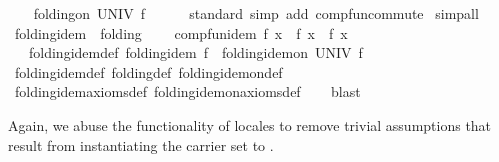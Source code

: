 \begin{isabellebody}
\ \ \isamarkupfalse%
\ {\isachardoublequoteopen}folding{\isacharunderscore}{\kern0pt}on\ UNIV\ f{\isachardoublequoteclose}\isanewline
\ \ \ \ \isamarkupfalse%
\ standard\ {\isacharparenleft}{\kern0pt}simp\ add{\isacharcolon}{\kern0pt}\ comp{\isacharunderscore}{\kern0pt}fun{\isacharunderscore}{\kern0pt}commute{\isacharparenright}{\kern0pt}\isanewline
{}\isamarkupfalse%
\ simp{\isacharunderscore}{\kern0pt}all%
\endisatagproof
{\isafoldproof}%
%
\isadelimproof
\isanewline
%
\endisadelimproof
\isanewline
{}\isamarkupfalse%
\isanewline
\isanewline
{}\isamarkupfalse%
\ folding{\isacharunderscore}{\kern0pt}idem\ {\isacharequal}{\kern0pt}\ folding\ {\isacharplus}{\kern0pt}\isanewline
\ \ \ comp{\isacharunderscore}{\kern0pt}fun{\isacharunderscore}{\kern0pt}idem{\isacharcolon}{\kern0pt}\ {\isachardoublequoteopen}f\ x\ {\isasymcirc}\ f\ x\ {\isacharequal}{\kern0pt}\ f\ x{\isachardoublequoteclose}\isanewline
{}\isanewline
\isanewline
{}\isamarkupfalse%
\ {\isacharparenleft}{\kern0pt}\ {\isacharminus}{\kern0pt}{\isacharparenright}{\kern0pt}\ folding{\isacharunderscore}{\kern0pt}idem{\isacharunderscore}{\kern0pt}def{\isacharprime}{\kern0pt}{\isacharcolon}{\kern0pt}\ {\isachardoublequoteopen}folding{\isacharunderscore}{\kern0pt}idem\ f\ {\isacharequal}{\kern0pt}\ folding{\isacharunderscore}{\kern0pt}idem{\isacharunderscore}{\kern0pt}on\ UNIV\ f{\isachardoublequoteclose}\isanewline
%
\isadelimproof
\ \ %
\endisadelimproof
%
\isatagproof
{}\isamarkupfalse%
\ folding{\isacharunderscore}{\kern0pt}idem{\isacharunderscore}{\kern0pt}def\ folding{\isacharunderscore}{\kern0pt}def{\isacharprime}{\kern0pt}\ folding{\isacharunderscore}{\kern0pt}idem{\isacharunderscore}{\kern0pt}on{\isacharunderscore}{\kern0pt}def\isanewline
\ \ \isamarkupfalse%
\ folding{\isacharunderscore}{\kern0pt}idem{\isacharunderscore}{\kern0pt}axioms{\isacharunderscore}{\kern0pt}def\ folding{\isacharunderscore}{\kern0pt}idem{\isacharunderscore}{\kern0pt}on{\isacharunderscore}{\kern0pt}axioms{\isacharunderscore}{\kern0pt}def\isanewline
\ \ \isamarkupfalse%
\ blast%
\endisatagproof
{\isafoldproof}%
%
\isadelimproof
%
\endisadelimproof
%
\begin{isamarkuptext}%
Again, we abuse the  functionality of locales to remove trivial assumptions that
  result from instantiating the carrier set to .%
\end{isamarkuptext}\isamarkuptrue%

\end{isabellebody}
